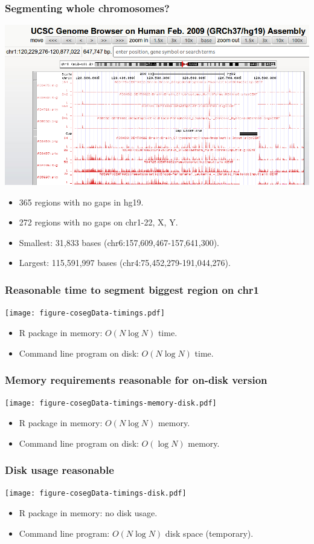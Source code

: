 \documentclass{beamer}
\begin{document}
\begin{frame}
  \frametitle{Segmenting whole chromosomes?}
  \includegraphics[width=\textwidth]{screenshot-gap-peaks}
  \begin{itemize}
  \item 365 regions with no gaps in hg19.
  \item 272 regions with no gaps on chr1-22, X, Y.
  \item Smallest: 31,833 bases (chr6:157,609,467-157,641,300).
  \item Largest: 115,591,997 bases (chr4:75,452,279-191,044,276).
  \end{itemize}
\end{frame}


\begin{frame}
  \frametitle{Reasonable time to segment biggest region on chr1}
  \texttt{[image: figure-cosegData-timings.pdf]}
  \begin{itemize}
  \item R package in memory: $O(N \log N)$ time.
  \item Command line program on disk: $O(N \log N)$ time.
  \end{itemize}
\end{frame}

\begin{frame}
  \frametitle{Memory requirements reasonable for on-disk version}
  \texttt{[image: figure-cosegData-timings-memory-disk.pdf]}
  \begin{itemize}
  \item R package in memory: $O(N \log N)$ memory.
  \item Command line program on disk: $O(\log N)$ memory.
  \end{itemize}
\end{frame}

\begin{frame}
  \frametitle{Disk usage reasonable}
  \texttt{[image: figure-cosegData-timings-disk.pdf]}
  \begin{itemize}
  \item R package in memory: no disk usage.
  \item Command line program: $O(N \log N)$ disk space (temporary).
  \end{itemize}
\end{frame}
\end{document}
